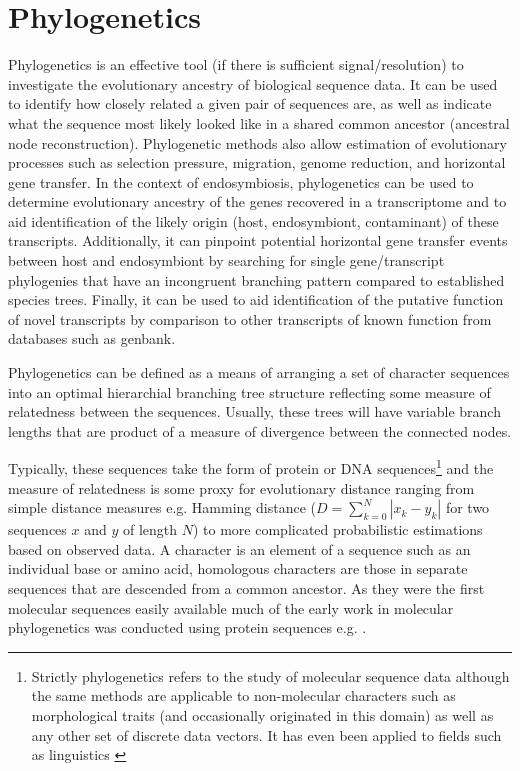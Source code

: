\section{Phylogenetics}

Phylogenetics is an effective tool (if there is sufficient signal/resolution) 
to investigate the evolutionary ancestry of biological sequence data.
It can be used to identify how closely related a given pair of sequences are, as
well as indicate what the sequence most likely looked like in a shared common
ancestor (ancestral node reconstruction). Phylogenetic methods also allow estimation
of evolutionary processes such as selection pressure,
migration, genome reduction, and horizontal gene transfer.
In the context of endosymbiosis, phylogenetics can be used to determine evolutionary ancestry of 
the genes recovered in a transcriptome and to aid identification of the likely origin 
(host, endosymbiont, contaminant) of these transcripts. Additionally, it can pinpoint
potential horizontal gene transfer events between host and endosymbiont by searching for single 
gene/transcript phylogenies that have an incongruent branching pattern
compared to established species trees.  Finally, it can be used to aid identification of the putative function 
of novel transcripts by comparison to other transcripts of known function 
from databases such as genbank. 


Phylogenetics can be defined as a means of arranging a set of character sequences into an optimal hierarchial
branching tree structure reflecting some measure of relatedness 
between the sequences. Usually, these trees will have variable
branch lengths that are product of a measure of divergence between the connected nodes.

Typically, these sequences take the form of protein or DNA sequences\footnote{
Strictly phylogenetics refers to the study of molecular sequence data although the same methods are applicable to
non-molecular characters such as morphological traits (and occasionally originated in this domain) as well as any
other set of discrete data vectors. It has even been applied to fields such as linguistics \citep{}
} and the measure of relatedness is some proxy for evolutionary distance ranging from simple distance measures 
e.g. Hamming distance (\(D = \sum_{k=0}^{N}|x_{k} - y_{k}|\) for two sequences \(x\) and \(y\) of length \(N\))
to more complicated probabilistic estimations based on observed data.
A character is an element of a sequence such as an individual base or amino acid, homologous 
characters are those in separate sequences that are descended from a common ancestor.  
As they were the first molecular sequences easily available much of the early work in molecular phylogenetics
was conducted using protein sequences e.g. \citep{eck1966atlas,Fitch1967}.

